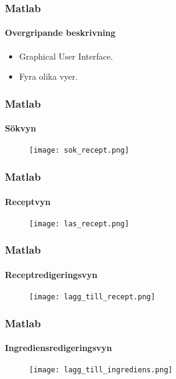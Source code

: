 \begin{frame}
  \frametitle{Matlab}
  \framesubtitle{Overgripande beskrivning}
  \begin{itemize}
  \item<1-> Graphical User Interface.
  \item<2-> Fyra olika vyer.
  \end{itemize}
\end{frame}

\begin{frame}
  \frametitle{Matlab}
  \framesubtitle{Sökvyn}
  \begin{figure}[H]
    \centering 
    \texttt{[image: sok\_recept.png]} 
  \end{figure}
\end{frame}

\begin{frame}
  \frametitle{Matlab}
  \framesubtitle{Receptvyn}
  \begin{figure}[H]
    \centering 
    \texttt{[image: las\_recept.png]} 
  \end{figure}
\end{frame}

\begin{frame}
  \frametitle{Matlab}
  \framesubtitle{Receptredigeringsvyn}
  \begin{figure}[H]
    \centering 
    \texttt{[image: lagg\_till\_recept.png]} 
  \end{figure}
\end{frame}

\begin{frame}
  \frametitle{Matlab}
  \framesubtitle{Ingrediensredigeringsvyn}
  \begin{figure}[H]
    \centering 
    \texttt{[image: lagg\_till\_ingrediens.png]} 
  \end{figure}
\end{frame}
